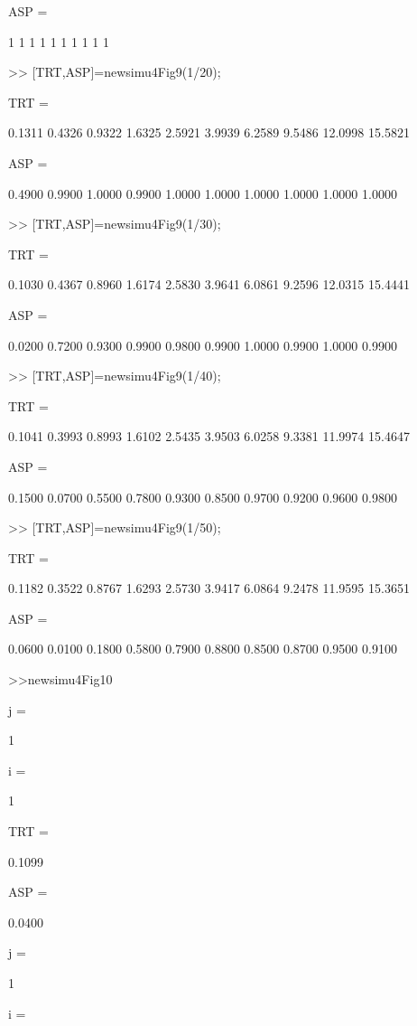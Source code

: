 ASP =

     1     1     1     1     1     1     1     1     1     1

>> [TRT,ASP]=newsimu4Fig9(1/20);

TRT =

    0.1311    0.4326    0.9322    1.6325    2.5921    3.9939    6.2589    9.5486   12.0998   15.5821


ASP =

    0.4900    0.9900    1.0000    0.9900    1.0000    1.0000    1.0000    1.0000    1.0000    1.0000
    

>> [TRT,ASP]=newsimu4Fig9(1/30);

TRT =

    0.1030    0.4367    0.8960    1.6174    2.5830    3.9641    6.0861    9.2596   12.0315   15.4441


ASP =

    0.0200    0.7200    0.9300    0.9900    0.9800    0.9900    1.0000    0.9900    1.0000    0.9900


    
>> [TRT,ASP]=newsimu4Fig9(1/40);

TRT =

    0.1041    0.3993    0.8993    1.6102    2.5435    3.9503    6.0258    9.3381   11.9974   15.4647


ASP =

    0.1500    0.0700    0.5500    0.7800    0.9300    0.8500    0.9700    0.9200    0.9600    0.9800

>> [TRT,ASP]=newsimu4Fig9(1/50);

TRT =

    0.1182    0.3522    0.8767    1.6293    2.5730    3.9417    6.0864    9.2478   11.9595   15.3651


ASP =

    0.0600    0.0100    0.1800    0.5800    0.7900    0.8800    0.8500    0.8700    0.9500    0.9100

    
>>newsimu4Fig10

j =

     1


i =

     1


TRT =

    0.1099


ASP =

    0.0400


j =

     1


i =

